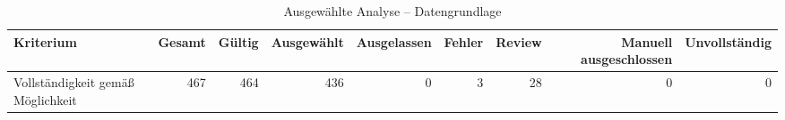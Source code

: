\begin{table}[htbp]
\centering
\caption{Ausgewählte Analyse -- Datengrundlage}
\begin{tabular}{lrrrrrrrr}
\toprule
Kriterium & Gesamt & Gültig & Ausgewählt & Ausgelassen & Fehler & Review & Manuell ausgeschlossen & Unvollständig \\
\midrule
Vollständigkeit gemäß Möglichkeit & 467 & 464 & 436 & 0 & 3 & 28 & 0 & 0 \\
\bottomrule
\end{tabular}
\end{table}
